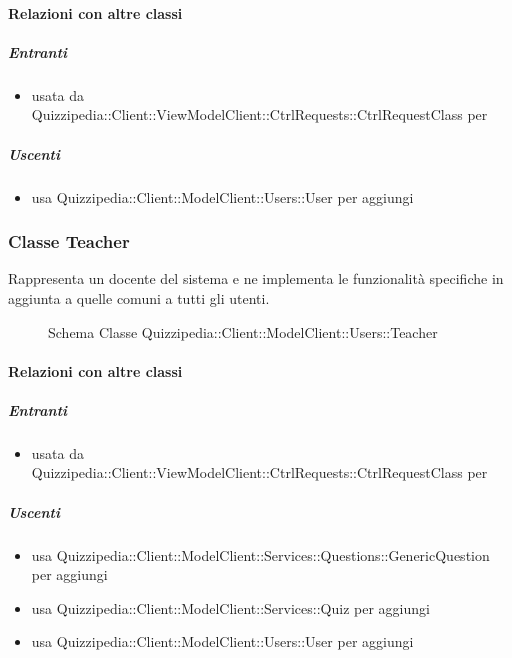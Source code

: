 \paragraph{Relazioni con altre classi}
\subparagraph{Entranti}
\begin{itemize}
\item usata da Quizzipedia::Client::ViewModelClient::CtrlRequests::CtrlRequestClass per 
\end{itemize}
\subparagraph{Uscenti}
\begin{itemize}
\item usa Quizzipedia::Client::ModelClient::Users::User per aggiungi
\end{itemize}
\subsubsection{Classe Teacher}
Rappresenta un docente del sistema e ne implementa le funzionalità specifiche in aggiunta a quelle comuni a tutti gli utenti.
\begin{figure}[H]
\centering
\noindent{}
\caption[Schema Classe Teacher]{Schema Classe Quizzipedia::Client::ModelClient::Users::Teacher}
\end{figure}
\paragraph{Relazioni con altre classi}
\subparagraph{Entranti}
\begin{itemize}
\item usata da Quizzipedia::Client::ViewModelClient::CtrlRequests::CtrlRequestClass per 
\end{itemize}
\subparagraph{Uscenti}
\begin{itemize}
\item usa Quizzipedia::Client::ModelClient::Services::Questions::GenericQuestion per aggiungi
\item usa Quizzipedia::Client::ModelClient::Services::Quiz per aggiungi
\item usa Quizzipedia::Client::ModelClient::Users::User per aggiungi
\end{itemize}
